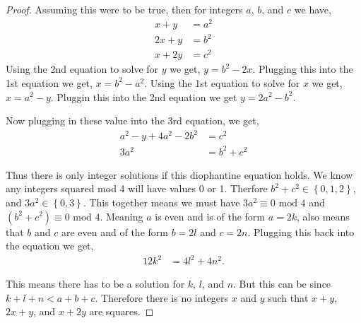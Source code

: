 \documentclass[11pt]{article}
\newcommand{\set}[1]{\left\{#1\right\}} %
\begin{document}
\begin{proof}
    Assuming this were to be true, then for integers $a$, $b$, and $c$ we have,
    \begin{align*}
        x+y &= a^{2} \\
        2x+y &= b^{2} \\
        x + 2y &= c^{2}
    \end{align*}
    Using the 2nd equation to solve for $y$ we get, $y = b^{2} -2x$. Plugging this into the 1st equation we get, $x = b^{2} - a^{2}$. Using the 1st equation to solve for $x$ we get, $x = a^{2} -y$. Pluggin this into the 2nd equation we get $y = 2a^{2} -b^{2}$.

    Now plugging in these value into the 3rd equation, we get,
    \begin{align*}
        a^{2}-y + 4a^{2} -2b^{2} &= c^{2} \\
        3a^{2} &= b^{2} + c^{2}
    \end{align*}

    Thus there is only integer solutions if this diophantine equation holds. We know any integers squared mod 4 will have values 0 or 1. Therfore $b^{2} + c^{2} \in \set{0,1,2}$, and $3a^{2}\in \set{0,3}$. This together means we must have $3a^{2} \equiv 0 \text{ mod } 4$ and $(b^{2} + c^{2}) \equiv 0 \text{ mod }4$. Meaning $a$ is even and is of the form $a = 2k$, also means that $b$ and $c$ are even and of the form $b = 2l$ and $c = 2n$. Plugging this back into the equation we get,
    \begin{align*}
        12k^{2} & = 4l^{2} + 4n^{2}.
    \end{align*}

    This means there has to be a solution for $k$, $l$, and $n$. But this can be since $k + l + n < a + b + c$. Therefore there is no integers $x$ and $y$ such that $x +y$, $2x +y$, and $x + 2y$ are squares.
\end{proof}
\end{document}
